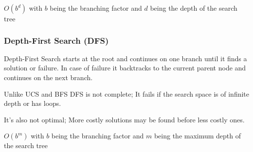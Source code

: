 \documentclass[
../../EiKI_Summary.tex,
]
{subfiles}
\begin{document}
 $O(b^{d})$ with $b$ being the branching factor and $d$ being the depth of the search tree

\subsubsection{Depth-First Search (DFS)}
Depth-First Search starts at the root and continues on one branch until it finds a solution or failure. In case of failure it backtracks to the current parent node and continues on the next branch. 

Unlike UCS and BFS DFS is not complete; It fails if the search space is of infinite depth or has loops. 

It's also not optimal; More costly solutions may be found before less costly ones.

 $O(b^m)$ with $b$ being the branching factor and $m$ being the maximum depth of the search tree
\end{document}
